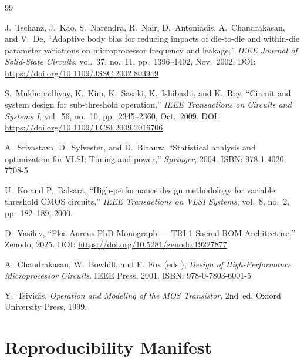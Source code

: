 \documentclass[12pt,a4paper]{report}
\theoremstyle{plain}
\theoremstyle{definition}
\theoremstyle{remark}
\begin{document}
\begin{thebibliography}{99}

J.~Tschanz, J.~Kao, S.~Narendra, R.~Nair, D.~Antoniadis, A.~Chandrakasan,
and V.~De,
``Adaptive body bias for reducing impacts of die-to-die and within-die
parameter variations on microprocessor frequency and leakage,''
\textit{IEEE Journal of Solid-State Circuits}, vol.~37, no.~11, pp.~1396--1402,
Nov.~2002.
DOI: \url{https://doi.org/10.1109/JSSC.2002.803949}

S.~Mukhopadhyay, K.~Kim, K.~Sasaki, K.~Ishibashi, and K.~Roy,
``Circuit and system design for sub-threshold operation,''
\textit{IEEE Transactions on Circuits and Systems I}, vol.~56, no.~10,
pp.~2345--2360, Oct.~2009.
DOI: \url{https://doi.org/10.1109/TCSI.2009.2016706}

A.~Srivastava, D.~Sylvester, and D.~Blaauw,
``Statistical analysis and optimization for VLSI: Timing and power,''
\textit{Springer}, 2004.
ISBN: 978-1-4020-7708-5

U.~Ko and P.~Balsara,
``High-performance design methodology for variable threshold CMOS circuits,''
\textit{IEEE Transactions on VLSI Systems}, vol.~8, no.~2, pp.~182--189, 2000.

D.~Vasilev,
``Flos Aureus PhD Monograph — TRI-1 Sacred-ROM Architecture,''
Zenodo, 2025.
DOI: \url{https://doi.org/10.5281/zenodo.19227877}

A.~Chandrakasan, W.~Bowhill, and F.~Fox (eds.),
\textit{Design of High-Performance Microprocessor Circuits}.
IEEE Press, 2001.
ISBN: 978-0-7803-6001-5

Y.~Tsividis,
\textit{Operation and Modeling of the MOS Transistor}, 2nd~ed.
Oxford University Press, 1999.

\end{thebibliography}

\chapter{Reproducibility Manifest}
\label{app:manifest}
\end{document}
